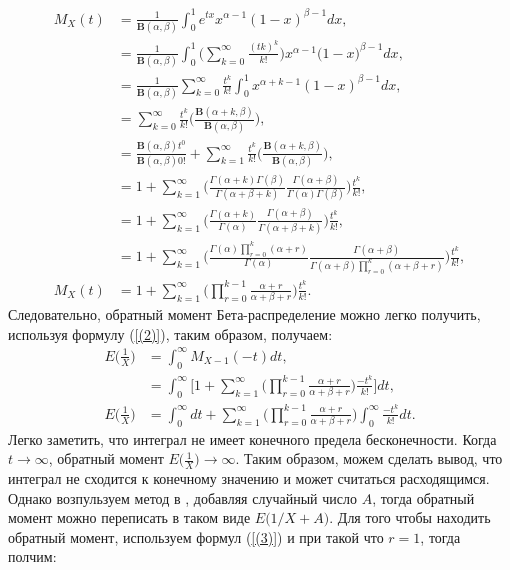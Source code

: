 \documentclass[13pt]{article}
\begin{document}
\begin{align*}
    M_{X}(t) &= \frac{1}{\mathbf{B}(\alpha , \beta)}\int_{0}^{1} e^{tx}x^{\alpha - 1}(1 - x)^{\beta - 1} dx, \\
    &= \frac{1}{\mathbf{B}(\alpha , \beta)} \int_{0}^{1} \bigg(\sum_{k=0}^{\infty} \frac{(tk)^{k}}{k!} \bigg) x^{\alpha-1} \big(1- x \big)^{\beta -1} dx, \\
    &=  \frac{1}{\mathbf{B}(\alpha , \beta)} \sum_{k=0}^{\infty}\frac{t^{k}}{k!} \int_{0}^{1} x^{\alpha + k -1} (1-x)^{\beta-1}dx, \\
    &= \sum_{k=0}^{\infty} \frac{t^{k}}{k!} \Bigg(\frac{\mathbf{B}(\alpha + k, \beta)}{\mathbf{B}(\alpha, \beta)} \Bigg) ,\\
    &= \frac{\mathbf{B}(\alpha, \beta)t^{0}}{\mathbf{B}(\alpha, \beta)0!} + \sum_{k=1}^{\infty} \frac{t^{k}}{k!} \Bigg(\frac{\mathbf{B}(\alpha + k, \beta)}{\mathbf{B}(\alpha, \beta)} \Bigg) ,\\
    &= 1 + \sum_{k=1}^{\infty}\Bigg(\frac{\Gamma(\alpha + k) \Gamma(\beta)}{\Gamma(\alpha + \beta + k)} \frac{\Gamma(\alpha + \beta)}{\Gamma(\alpha)\Gamma(\beta)} \Bigg)\frac{t^{k}}{k!},\\
    &= 1 + \sum_{k=1}^{\infty}\Bigg( \frac{\Gamma(\alpha + k)}{\Gamma(\alpha)} \frac{\Gamma(\alpha + \beta)}{\Gamma(\alpha + \beta + k)} \Bigg) \frac{t^{k}}{k!} ,\\
    &= 1 + \sum_{k=1}^{\infty} \Bigg( \frac{\Gamma(\alpha) \prod_{r=0}^{k}(\alpha + r)}{\Gamma(\alpha)} \frac{\Gamma(\alpha + \beta)}{\Gamma(\alpha + \beta) \prod_{r = 0 }^{k}(\alpha + \beta + r)} \Bigg) \frac{t^{k}}{k!} ,\\
M_{X}(t) &= 1 + \sum_{k=1}^{\infty}\Bigg( \prod_{r=0}^{k-1} \frac{\alpha + r}{\alpha + \beta + r}\Bigg)\frac{t^{k}}{k!} .
\end{align*}
Следовательно, обратный момент Бета-распределение можно легко получить, используя формулу (\ref{(2)}), таким образом, получаем:
\begin{align*}
    E\bigg(\frac{1}{X}\bigg) &= \int_{0}^{\infty} M_{X-1}(-t)dt , \\
     &=  \int_{0}^{\infty} \bigg[1 + \sum_{k=1}^{\infty}\Bigg( \prod_{r=0}^{k-1} \frac{\alpha + r}{\alpha + \beta + r}\Bigg)\frac{-t^{k}}{k!}\bigg]dt, \\
    E\bigg(\frac{1}{X}\bigg) &=  \int_{0}^{\infty}dt + \sum_{k=1}^{\infty}\Bigg( \prod_{r=0}^{k-1} \frac{\alpha + r}{\alpha + \beta + r}\Bigg) \int_{0}^{\infty} \frac{-t^{k}}{k!} dt.
\end{align*}
Легко заметить, что интеграл не имеет конечного предела бесконечности. Когда $ t \to \infty$, обратный момент $E\big(\frac{1}{X} \big) \to \infty$. Таким образом, можем сделать вывод, что интеграл не сходится к конечному значению и может считаться расходящимся. Однако возпульзуем метод в \cite{chao1972negative}, добавляя случайный число $A$, тогда обратный момент можно переписать в таком виде $E\big(1/X+A\big)$. Для того чтобы находить обратный момент, используем формул (\ref{(3)}) и при такой что $r=1$, тогда полчим:
\end{document}
